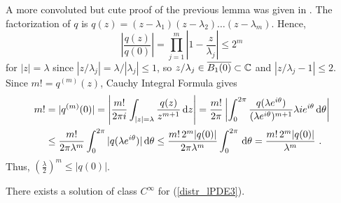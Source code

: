 \begin{rmk}
A more convoluted but cute proof of the previous lemma was given in
\cite{FoPDE}.  The factorization of $q$ is
$\displaystyle q(z) = (z-\lambda_1)(z-\lambda_2)\ldots(z-\lambda_m)$.
Hence,
\[
\left| \frac{q(z)}{q(0)} \right| = \prod_{j=1}^m
\left| 1 - \frac{z}{\lambda_j} \right| \leq 2^m
\]
for $|z|= \lambda$ since $|z/\lambda_j| = \lambda/|\lambda_j| \leq 1$,
so $z/\lambda_j \in \overline{B_1(0)} \subset \mathbb{C}$ and
$|z/\lambda_j - 1| \leq 2$.  Since $\displaystyle m! = q^{(m)}(z)$,
Cauchy Integral Formula gives
\begin{align*}
m! & = |q^{(m)}(0)| = \left| \frac{m!}{2\pi i}
\int_{|z|=\lambda} \frac{q(z)}{z^{m+1}} \,\mathrm{d}{z} \right|
= \frac{m!}{2\pi} \left| \int_0^{2\pi}
\frac{q(\lambda e^{i\theta})}{(\lambda e^{i\theta})^{m+1}}
\lambda i e^{i\theta} \,\mathrm{d}{\theta}\right| \\
& \leq \frac{m!}{2\pi \lambda^m} \int_0^{2\pi}
|q(\lambda e^{i\theta})| \,\mathrm{d}{\theta}
\leq \frac{m!\, 2^m |q(0)|}{2\pi \lambda^m} \int_0^{2\pi} \,\mathrm{d}{\theta}
= \frac{m!\, 2^m |q(0)|}{\lambda^m} \ .
\end{align*}
Thus, $\displaystyle \left(\frac{\lambda}{2}\right)^m \leq |q(0)|$.
\end{rmk}

\begin{theorem} \label{distr_lPDE3_ex4}
There exists a solution of class $\displaystyle C^\infty$ for
(\ref{distr_lPDE3}).
\end{theorem}

